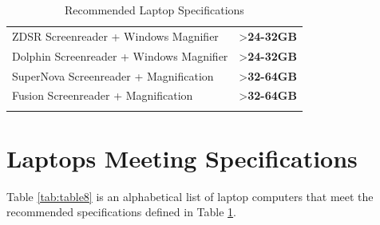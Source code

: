 \documentclass[12pt,letterpaper,twoside,openright]{report}
\begin{document}
\begin{longtable}[]{@{}
	>{\raggedright\arraybackslash}m{}
	>{\raggedright\arraybackslash}b{}@{}
	}
	ZDSR Screenreader + Windows Magnifier                                                                                                                                                                                                                                            & \textgreater\textbf{24-32GB} \\[1.0em]
	Dolphin Screenreader + Windows Magnifier                                                                                                                                                                                                                                         & \textgreater\textbf{24-32GB} \\[1.0em]
	SuperNova Screenreader + Magnification                                                                                                                                                                                                                                           & \textgreater\textbf{32-64GB} \\[1.0em]
	Fusion Screenreader + Magnification                                                                                                                                                                                                                                              & \textgreater\textbf{32-64GB} \\[1.0em] \hline
	\caption{Recommended Laptop Specifications}\label{tab:table7}
\end{longtable}

\pagebreak
\hypertarget{laptops-meeting-recommended-specifications}{}\section{Laptops Meeting Specifications}\label{laptops-meeting-recommended-specifications}
Table \ref{tab:table8} is an alphabetical list of laptop computers that meet the recommended specifications defined in Table \ref{tab:table7}.
\end{document}
